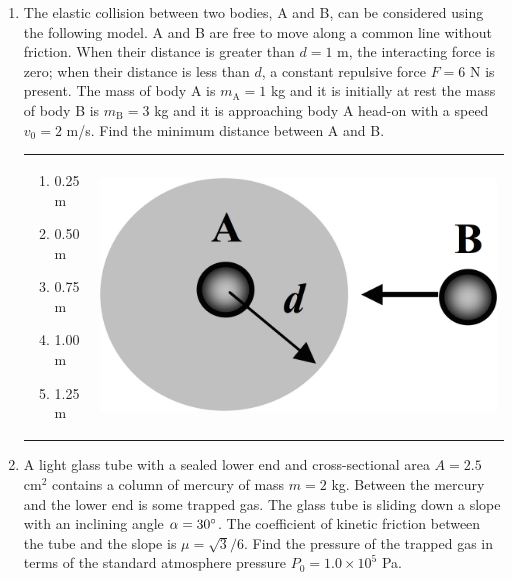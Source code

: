 \documentclass[12pt,letterpaper]{article}
\begin{document}
\begin{enumerate}
\vfill
\newpage

\item
The elastic collision between two bodies, A and B, can be considered using the following model. A and B are free to move along a common line without friction. When their distance is greater than $d=1$ m, the interacting force is zero; when their distance is less than $d$, a constant repulsive force $F=6$ N is present. The mass of body A is $m_\text{A}=1$ kg and it is initially at rest the mass of body B is $m_\text{B}=3$ kg and it is approaching body A head-on with a speed $v_0=2$ m/s. Find the minimum distance between A and B.

\begin{tabular}{l r}

\begin{minipage}{0.6\textwidth}
\begin{enumerate}
\item 0.25 m
\item 0.50 m
\item 0.75 m
\item 1.00 m
\item 1.25 m
\end{enumerate}
\end{minipage} &
\begin{minipage}{0.3\textwidth}
\includegraphics[width=\textwidth]{interaction.png}
\end{minipage}
\end{tabular}

\item
A light glass tube with a sealed lower end and cross-sectional area $A = 2.5$ cm$^2$ contains a column of mercury of mass $m=2$ kg. Between the mercury and the lower end is some trapped gas. The glass tube is sliding down a slope with an inclining angle $\alpha=30\degree$. The coefficient of kinetic friction between the tube and the slope is $\mu=\sqrt{3}/6$. Find the pressure of the trapped gas in terms of the standard atmosphere pressure $P_0=1.0 \times 10^5$ Pa.


\end{enumerate}
\end{document}

